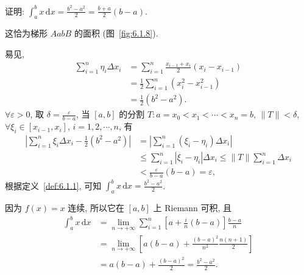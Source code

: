 \begin{example}\label{ex:6.1.12}
证明: $\int_{a}^{b}x\,\mathrm{d}x=\frac{b^{2}-a^{2}}{2}=\frac{b+a}{2}(b-a)$.
\end{example}

这恰为梯形 $AabB$ 的面积 (图~\ref{fig:6.1.8}).

\begin{solution}[证法 1]
易见,
\begin{align*}
\sum_{i=1}^{n}\eta_{i}\Delta x_{i}&=\sum_{i=1}^{n}\frac{x_{i-1}+x_{i}}{2}(x_{i}-x_{i-1})\\
&=\frac{1}{2}\sum_{i=1}^{n}(x_{i}^{2}-x_{i-1}^{2})\\
&=\frac{1}{2}(b^{2}-a^{2}).
\end{align*}
$\forall\varepsilon>0$, 取 $\delta=\frac{\varepsilon}{b-a}$, 当 $[a,b]$ 的分割 $T:a=x_{0}<x_{1}<\cdots<x_{n}=b$, $\|T\|<\delta$, $\forall\xi_{i}\in[x_{i-1},x_{i}]$, $i=1,2,\cdots,n$, 有
\begin{align*}
\left|\sum_{i=1}^{n}\xi_{i}\Delta x_{i}-\frac{1}{2}(b^{2}-a^{2})\right|&=\left|\sum_{i=1}^{n}(\xi_{i}-\eta_{i})\Delta x_{i}\right|\\
&\leqslant\sum_{i=1}^{n}|\xi_{i}-\eta_{i}|\Delta x_{i}\leqslant\|T\|\sum_{i=1}^{n}\Delta x_{i}\\
&<\frac{\varepsilon}{b-a}(b-a)=\varepsilon,
\end{align*}
根据定义~\ref{def:6.1.1}, 可知 $\int_{a}^{b}x\,\mathrm{d}x=\frac{b^{2}-a^{2}}{2}$.
\end{solution}

\begin{solution}[证法 2]
因为 $f(x)=x$ 连续, 所以它在 $[a,b]$ 上 Riemann 可积, 且
\begin{align*}
\int_{a}^{b}x\,\mathrm{d}x&=\lim_{n\to+\infty}\sum_{i=1}^{n}\left[a+\frac{i}{n}(b-a)\right]\frac{b-a}{n}\\
&=\lim_{n\to+\infty}\left[a(b-a)+\frac{(b-a)^{2}}{n^{2}}\frac{n(n+1)}{2}\right]\\
&=a(b-a)+\frac{(b-a)^{2}}{2}=\frac{b^{2}-a^{2}}{2}.
\end{align*}
\end{solution}

